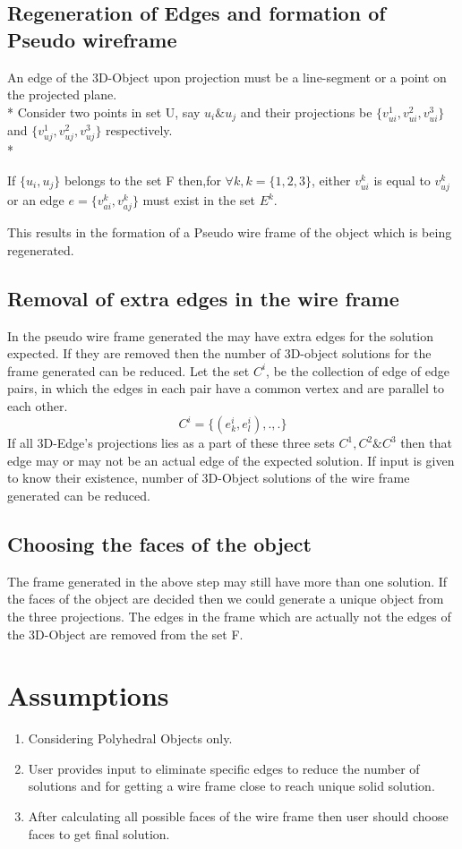 \documentclass[a4paper]{article}
\begin{document}
   \subsection{Regeneration of Edges and formation of Pseudo wireframe}
   An edge of the 3D-Object upon projection must be a line-segment or a point on the projected plane.
 \\*  Consider two points in set U, say $u_i \& u_j$ and their projections be $\{v^1_{ui},v^2_{ui},v^3_{ui}\}$ and  $\{v^1_{uj},v^2_{uj},v^3_{uj}\}$ respectively.
 \\*
   
   If $\{u_i,u_j\}$ belongs to the set F then,for $\forall k, k=\{1,2,3\}$, either  $v^k_{ui}$ is equal to $v^k_{uj}$ or an edge $e=\{v^k_{ai},v^k_{aj}\}$ must exist in the set $E^k$.
   
   This results in the formation of a Pseudo wire frame of the object which is being regenerated. 
   \subsection{Removal of extra edges in the wire frame}
   In the pseudo wire frame generated the may have extra edges for the solution expected. If they are removed then the number of 3D-object solutions for the frame generated can be reduced. Let the set $C^i$, be the collection of edge of edge pairs, in which the edges in each pair have a common vertex and are parallel to each other. 
   \begin{equation}
   	   	   	C^i=\{(e^i_k,e^i_l),.,.\}
   \end{equation}
   If all 3D-Edge's projections lies as a part of these three sets $C^1,C^2 \& C^3$ then that edge may or may not be an actual edge of the expected solution. If input is given to know their existence, number of 3D-Object solutions of the wire frame generated can be reduced.      
   \subsection{Choosing the faces of the object}
   The frame generated in the above step may still have more than one solution. If the faces of the object are decided then we could generate a unique object from the three projections. The edges in the frame which are actually not the edges of the 3D-Object are removed from the set F.
 
 \section{Assumptions}
 	\begin{enumerate}
 	\item Considering Polyhedral Objects only.
    \item User provides input to eliminate specific edges to reduce the number of solutions and for getting a wire frame close to reach unique solid solution.
    \item After calculating all possible faces of the wire frame then user should choose faces to get final solution.
 	\end{enumerate}
\end{document}
